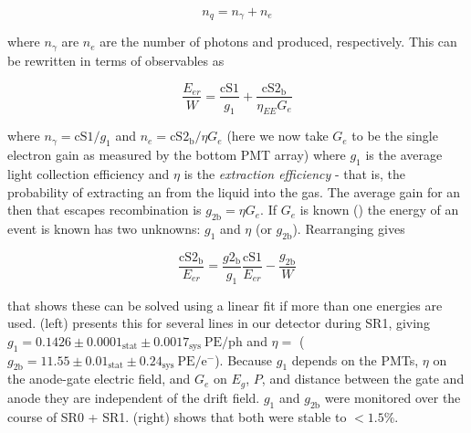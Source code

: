 \begin{equation}
n_q = n_{\gamma} + n_e
\end{equation}

\noindent where $n_{\gamma}$ are $n_e$ are the number of photons and \electron produced, respectively.  This can be rewritten in terms of
observables as

\begin{equation}
\frac{E_{er}}{W} = \frac{\mathrm{cS1}}{g_1} + \frac{\mathrm{cS2_b}}{\eta_{EE} G_e}
\label{eq:calibrations_s1_s2}
\end{equation}

\noindent where $n_{\gamma} = \mathrm{cS1} / g_1$ and $n_e = \mathrm{cS2_b} / \eta G_e$ (here we now take $G_e$ to be the single electron
gain as measured by the bottom PMT array) where $g_1$ is the average light collection
efficiency and $\eta$
is the \textit{extraction efficiency} - that is, the probability of extracting an \electron from the liquid into the gas.  The average
gain for an \electron then that escapes recombination is $g_{2 \mathrm{b}} = \eta G_e$.  If $G_e$ is known
() the energy of an event is known  has two unknowns:
$g_1$ and $\eta$ (or $g_{2 \mathrm{b}}$).  Rearranging gives

\begin{equation}
\frac{\mathrm{cS2_b}}{E_{er}} = \frac{g2_{\mathrm{b}}}{g_1} \frac{\mathrm{cS1}}{E_{er}} - \frac{g_{2 \mathrm{b}}}{W}
\end{equation}

\noindent that shows these can be solved using a linear fit if more than one energies are
used.   (left) presents this for several lines in our
detector during SR1, giving
$g_1 = 0.1426 \pm 0.0001_{\mathrm{stat}} \pm 0.0017_{\mathrm{sys}}\ \mathrm{PE/ph}$ and $\eta = $
($g_{2 \mathrm{b}} = 11.55 \pm 0.01_{\mathrm{stat}} \pm 0.24_{\mathrm{sys}}\ \mathrm{PE/e^-}$).  Because $g_1$ depends on the PMTs,
$\eta$ on the anode-gate electric field, and $G_e$ on $E_g$, $P$, and distance between the gate and anode they are independent of the
drift field.  $g_1$ and $g_{2 \mathrm{b}}$ were monitored over the
course of SR0 + SR1.   (right) shows that both
were stable to $< 1.5 \%$.


